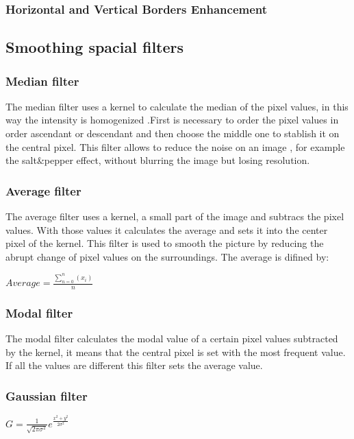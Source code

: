 \documentclass[a4paper]{article}
\begin{document}
\subsubsection{Horizontal and Vertical Borders Enhancement}




\subsection{Smoothing spacial filters}

\subsubsection{Median filter}

The median filter uses a kernel to calculate the median of the pixel values, in this way the intensity is homogenized .First is necessary to order the pixel values in order ascendant or descendant and then choose the middle one to stablish it on the central pixel.
This filter allows to reduce the noise on an image , for example the salt\&pepper effect, without blurring the image but losing resolution.



\subsubsection{Average filter}

The average filter uses a kernel, a small part of the image and subtracs the pixel values. With those values it calculates the average and sets it into the center pixel of the kernel. This filter is used to smooth the picture by reducing the abrupt change of pixel values on the surroundings. The average is difined by:

\begin{math}
Average= \frac{\sum_{n=0}^{n}\!\!(x_i)}{n}
\end{math}



\subsubsection{Modal filter}

The modal filter calculates the modal value of a certain pixel values subtracted by the kernel, it means that the central pixel is set with the most frequent value. If all the values are different this filter sets the average value.

\subsubsection{Gaussian filter}
\begin{math}
G= \frac{1}{\sqrt{2\pi\sigma^2}}e^\frac{x^2+y^2}{2\sigma^2}
\end{math}
\end{document}
